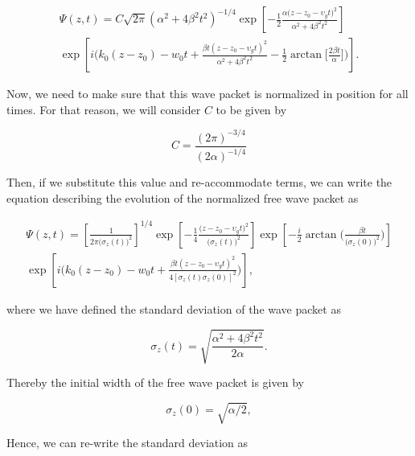 \documentclass{article}
\begin{document}
\begin{multline}\label{free_wave_packet_position_space_centered_z0} 
    \Psi (z, t) = C \sqrt{2 \pi} (\alpha^{2} + 4\beta^{2}t^{2})^{-1/4} \exp \left[-\frac{1}{2} \frac{\alpha \big(z - z_{0} - \upsilon_{g} t \big)^{2}}{\alpha^{2} + 4\beta^{2}t^{2}}  \right] \\ \exp \left[i \bigg(k_{0}(z-z_{0}) - w_{0}t + \frac{\beta t (z - z_{0} - \upsilon_{g} t)^{2}}{\alpha^{2} + 4\beta^{2}t^{2}} - \frac{1}{2} \arctan\bigg[\frac{2 \beta t }{\alpha}\bigg]\bigg) \right].
\end{multline}

Now, we need to make sure that this wave packet is normalized in position for all times. For that reason, we will consider $C$ to be given by

\begin{equation}
C = \frac{(2 \pi)^{-3/4}}{(2 \alpha)^{-1/4}}
\end{equation}

Then, if we substitute this value and re-accommodate terms, we can write the equation describing the evolution of the normalized free wave packet as

\begin{multline}\label{free_wave_packet_position_space_centered_z0_pre_final_form} 
    \Psi (z, t) = \left[\frac{1}{2 \pi \big(\sigma_{z}(t)\big)^2} \right]^{1/4} \exp \left[-\frac{1}{4} \frac{ \big(z - z_{0} - \upsilon_{g} t \big)^{2}}{\big(\sigma_{z}(t)\big)^{2}} \right] \exp \left[-\frac{i}{2} \arctan\Bigg(\frac{\beta t }{\big(\sigma_{z}(0)\big)^{2}}\Bigg) \right] \\ \exp \left[i \bigg(k_{0}(z-z_{0}) - w_{0}t + \frac{ \beta t (z - z_{0} - \upsilon_{g} t)^{2}}{ 4[\sigma_{z}(t)\sigma_{z}(0)]^{2}} \bigg) \right],
\end{multline}

where we have defined the standard deviation of the wave packet as

\begin{equation}
\sigma_{z}(t) = \sqrt{\frac{\alpha^{2} + 4\beta^{2}t^{2}}{2 \alpha}}.
\end{equation}

Thereby the initial width of the free wave packet is given by

\begin{equation}
\sigma_{z}(0) = \sqrt{\alpha / 2},
\end{equation}

Hence, we can re-write the standard deviation as
\end{document}
